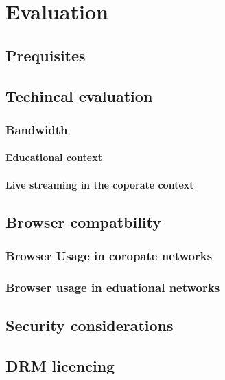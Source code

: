 \chapter{Evaluation}\label{ch:evaluation}

\section{Prequisites}

\section{Techincal evaluation}

\subsection{Bandwidth}
\subsubsection{Educational context}
\subsubsection{Live streaming in the coporate context}

\section{Browser compatbility}

\subsection{Browser Usage in coropate networks}

\subsection{Browser usage in eduational networks}

\section{Security considerations}

\section{DRM licencing}
